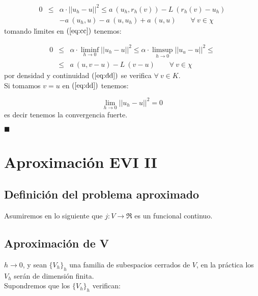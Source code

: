 \begin{demosteorema}
\begin{itemize}
\begin{eqnarray}\label{eq:cc}
0& \le & \alpha \cdot ||u_h-u||^2\le a\ (u_h,r_h(v))-L\ (r_h(v)-u_h) \\
\nonumber
& & -a\ (u_h,u)-a\ (u,u_h)+a\ (u,u)\qquad \forall \ v \in \chi
\end{eqnarray}
tomando l\'{\i}mites en $(\ref{eq:cc})$ tenemos:

\begin{eqnarray}\label{eq:dd}
0&\le &\alpha \cdot \liminf_{h\to 0} ||u_h-u||^2 \le \alpha \cdot
\limsup_{h\to 0} ||u_u-u||^2\le \\ \nonumber
&\le &a\ (u,v-u)-L\ (v-u)\qquad \forall \ v \in \chi
\end{eqnarray}
por densidad y continuidad $(\ref{eq:dd})$ se verifica $\forall \ v \in K$.\\

Si tomamos $v=u$ en $(\ref{eq:dd})$ tenemos:

\begin{displaymath}
\lim_{h \to 0} ||u_h-u||^2 = 0
\end{displaymath}
es decir tenemos la convergencia fuerte.

\end{itemize}

\begin{flushright}
$\blacksquare$
\end{flushright}
\end{demosteorema}
\newpage

\section{Aproximaci\'on EVI II}

\subsection{Definici\'on del problema aproximado}

Asumiremos en lo siguiente que $j:V\longrightarrow \Re$ es un funcional
continuo.

\subsection{Aproximaci\'on de V}

$h\to 0$, y sean $\{ V_h\}_h$ una familia de subespacios cerrados de $V$, en
la pr\'actica los $V_h$ ser\'an de dimensi\'on finita.\\

Supondremos que los $\{ V_h \}_h$ verifican:

